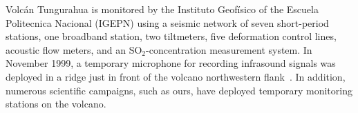 Volc\'{a}n Tungurahua is monitored by the Instituto Geof\'{i}sico of the
Escuela Politecnica Nacional (IGEPN) using a seismic network of seven
short-period stations, one broadband station, two tiltmeters, five
deformation
control lines, acoustic flow meters, and an SO$_2$-concentration
measurement system. In November 1999, a temporary microphone for
recording infrasound signals was deployed in a ridge just in front of
the volcano northwestern flank~\cite{Johnson03}.
In addition, numerous scientific campaigns, such as ours, have deployed 
temporary monitoring stations on the volcano.

